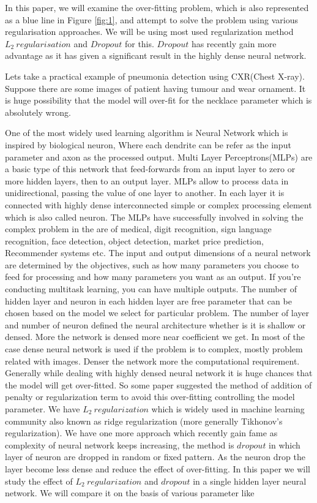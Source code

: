 \documentclass{article}
\begin{document}
\begin{multicols}{2}
  
In this paper, we will examine the over-fitting problem, which is also represented as a blue line in Figure \ref{fig:1}, and attempt to solve the problem using various regularisation approaches. We will be using most used regularization method $L_2 \ regularisation$ and $Dropout$ for this. $Dropout$ has recently gain more advantage as it has given a significant result in the highly dense neural network. 

Lets take a practical example of pneumonia detection using CXR(Chest X-ray). Suppose there are some images of patient having tumour and wear ornament. It is huge possibility that the model will over-fit for the necklace parameter which is absolutely wrong. 

One of the most widely used learning algorithm is Neural Network which is inspired by biological neuron, Where each dendrite can be refer as the input parameter and axon as the processed output. Multi Layer Perceptrons(MLPs) are a basic type of this network that feed-forwards from an input layer to zero or more hidden layers, then to an output layer. MLPs allow to process data in unidirectional, passing the value of one layer to another. In each layer it is connected with highly dense interconnected simple or complex processing element which is also called neuron. The MLPs have successfully involved in solving the complex problem in the are of medical, digit recognition, sign language recognition, face detection, object detection, market price prediction, Recommender systems etc. The input and output dimensions of a neural network are determined by the objectives, such as how many parameters you choose to feed for processing and how many parameters you want as an output. If you're conducting multitask learning, you can have multiple outputs. The number of hidden layer and neuron in each hidden layer are free parameter that can be chosen based on the model we select for particular problem. The number of layer and number of neuron defined the neural architecture whether is it is shallow or densed. More the network is densed more near coefficient we get. In most of the case dense neural network is used if the problem is to complex, mostly problem related with images. Denser the network more the computational requirement. Generally while dealing with highly densed neural network it is huge chances that the model will get over-fitted. So some paper suggested the method of addition of penalty or regularization term to avoid this over-fitting controlling the model parameter. We have $L_2 \ regularization$ which is widely used in machine learning community also known as ridge regularization (more generally Tikhonov’s regularization)\cite{NIPS2011_33ceb07b}. We have one more approach which recently gain fame as complexity of neural network keeps increasing, the method is $dropout$ in which layer of neuron are dropped in random or fixed pattern. As the neuron drop the layer become less dense and reduce the effect of over-fitting. In this paper we will study the effect of $L_2 \ regularization$ and $dropout$ in a single hidden layer neural network. We will compare it on the basis of various parameter like 
\end{multicols}
\end{document}

